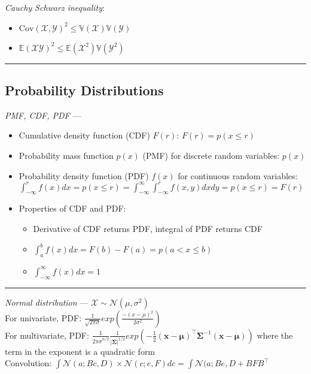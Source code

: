 \emph{Cauchy Schwarz inequality}: \begin{itemize}
    \item $\textrm{Cov}(\mathcal{X},\mathcal{Y})^2 \leq \mathbb{V}(\mathcal{X})\mathbb{V}(\mathcal{Y})$
    \item $\mathbb{E}(\mathcal{X}\mathcal{Y})^2 \leq \mathbb{E}(\mathcal{X}^2)\mathbb{V}(\mathcal{Y}^2)$
\end{itemize}

{\color{black}\hrule height 0.001mm}

\subsection*{Probability Distributions}
\emph{PMF, CDF, PDF} --- 
\begin{itemize}
    \item Cumulative density function (CDF) $F(r)$: $F(r) = p(x \leq r)$
    \item Probability mass function $p(x)$ (PMF) for discrete random variables: $p(x)$
    \item Probability density function (PDF) $f(x)$ for continuous random variables: $\int_{-\infty}^r f(x)dx = p(x \leq r) = \int_{-\infty}^{\infty} \int_{-\infty}^r f(x,y) dx dy = p(x \leq r) = F(r)$
    \item Properties of CDF and PDF:
    \begin{itemize}
        \item Derivative of CDF returns PDF, integral of PDF returns CDF
        \item $\int_a^b f(x)dx = F(b)-F(a) = p(a < x \leq b)$
        \item $\int_{-\infty}^\infty f(x)dx = 1$
    \end{itemize}
\end{itemize}

{\color{lightgray}\hrule height 0.001mm}

\emph{Normal distribution} --- 
$\mathcal{X} \sim \mathcal{N}(\mu, \sigma^2)$\\
For univariate, PDF: $\frac{1}{\sqrt{2\pi\sigma}} exp(\frac{-(x-\mu)^2}{2\sigma^2})$\\
For multivariate, PDF: $\frac{1}{{2\pi\sigma}^{n/2}} \frac{1}{|\boldsymbol{\Sigma}|^{1/2}} exp(-\frac{1}{2} (\boldsymbol{x}-\boldsymbol{\mu})^\intercal \boldsymbol{\Sigma}^{-1} (\boldsymbol{x}-\boldsymbol{\mu}))$ where the term in the exponent is a quadratic form\\
Convolution: $\int \mathcal{N}(a;Bc,D) \times \mathcal{N}(c;e,F) dc = \int \mathcal{N}(a;Be,D + BFB^\intercal$

